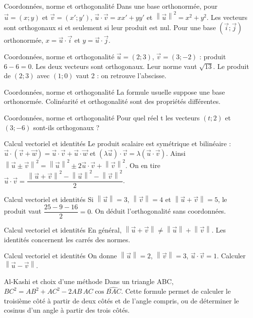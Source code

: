 \documentclass[aspectratio=169,10pt]{beamer}
\providecommand{\norm}[1]{\left\lVert #1\right\rVert}
\begin{document}
\begin{frame}{Coordonnées, norme et orthogonalité}
Dans une base orthonormée, pour \(\vec u=(x;y)\) et \(\vec v=(x\prime;y\prime)\), \(\vec u\cdot\vec v=xx\prime+yy\prime\) et \(\norm{\vec u}^2=x^2+y^2\). Les vecteurs sont orthogonaux si et seulement si leur produit est nul. Pour une base \((\vec i;\vec j)\) orthonormée, \(x=\vec u\cdot\vec i\) et \(y=\vec u\cdot\vec j\).
\end{frame}
\begin{frame}{Coordonnées, norme et orthogonalité}
\(\vec u=(2;3)\), \(\vec v=(3;-2)\) : produit \(6-6=0\). Les deux vecteurs sont orthogonaux. Leur norme vaut \(\sqrt{13}\). Le produit de \((2;3)\) avec \((1;0)\) vaut 2 : on retrouve l’abscisse.
\end{frame}
\begin{frame}{Coordonnées, norme et orthogonalité}
La formule usuelle suppose une base orthonormée. Colinéarité et orthogonalité sont des propriétés différentes.
\end{frame}
\begin{frame}{Coordonnées, norme et orthogonalité}
Pour quel réel t les vecteurs \((t;2)\) et \((3;-6)\) sont-ils orthogonaux ?
\end{frame}
\begin{frame}{Calcul vectoriel et identités}
Le produit scalaire est symétrique et bilinéaire : \(\vec u\cdot(\vec v+\vec w)=\vec u\cdot\vec v+\vec u\cdot\vec w\) et \((\lambda\vec u)\cdot\vec v=\lambda(\vec u\cdot\vec v)\). Ainsi \(\norm{\vec u\pm\vec v}^2=\norm{\vec u}^2\pm2\vec u\cdot\vec v+\norm{\vec v}^2\). On en tire \(\vec u\cdot \vec v=\dfrac{\norm{\vec u+\vec v}^2-\norm{\vec u}^2-\norm{\vec v}^2}{2}\).
\end{frame}
\begin{frame}{Calcul vectoriel et identités}
Si \(\norm{\vec u}=3\), \(\norm{\vec v}=4\) et \(\norm{\vec u+\vec v}=5\), le produit vaut \(\dfrac{25-9-16}{2}=0\). On déduit l’orthogonalité sans coordonnées.
\end{frame}
\begin{frame}{Calcul vectoriel et identités}
En général, \(\norm{\vec u+\vec v}\ne\norm{\vec u}+\norm{\vec v}\). Les identités concernent les carrés des normes.
\end{frame}
\begin{frame}{Calcul vectoriel et identités}
On donne \(\norm{\vec u}=2\), \(\norm{\vec v}=3\), \(\vec u\cdot\vec v=1\). Calculer \(\norm{\vec u-\vec v}\).
\end{frame}
\begin{frame}{Al-Kashi et choix d’une méthode}
Dans un triangle ABC, \(BC^2=AB^2+AC^2-2AB\,AC\cos\widehat{BAC}\). Cette formule permet de calculer le troisième côté à partir de deux côtés et de l’angle compris, ou de déterminer le cosinus d’un angle à partir des trois côtés.
\end{frame}
\end{document}
